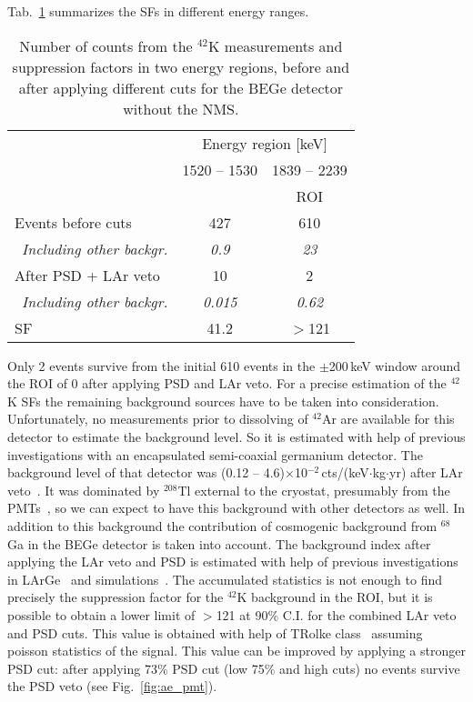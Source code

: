 \documentclass[twocolumn,epjc3]{svjour3}
\newcommand{\bbno} {{0\textnu\textbeta\textbeta\xspace}}
\newcommand{\ctsper} {{cts/(keV\(\cdot\)kg\(\cdot\)yr)}}
\newcommand{\LArGe} {{{LArGe}\xspace}}
\newcommand{\I}[2]{$^{#1}$#2}
\begin{document}
Tab.~\ref{tab:suppress_bare} summarizes the SFs in different energy ranges.
\begin{table}
  \begin{center}
  \caption{\label{tab:suppress_bare}Number of counts from the \I{42}{K} measurements and suppression factors in two energy regions, before and after applying different cuts for the BEGe detector without the NMS.}
\begin{tabular}{lcc}
\toprule
 &\multicolumn{2}{c}{Energy region [keV]} \\
 & 1520 -- 1530 & 1839 -- 2239  \\
 &  & ROI \\
\hline
Events before cuts & 427 & 610  \\
~\textit{Including other backgr.} & \textit{0.9} & \textit{23} \\
After PSD + LAr veto & 10 & 2 \\
~\textit{Including other backgr.} & \textit{0.015} & \textit{0.62} \\
SF & 41.2 &  \(>\)121 \\
\bottomrule
\end{tabular}
  \end{center}
\end{table}
Only 2 events survive from the initial 610 events in the $\pm$200\,keV window around the ROI of \bbno{} after applying PSD and LAr veto. For a precise estimation of the \I{42}{K} SFs the remaining background sources have to be taken into consideration. Unfortunately, no measurements prior to dissolving of \I{42}{Ar} are available for this detector to estimate the background level. So it is estimated with help of previous investigations with an encapsulated semi-coaxial germanium detector. The background level of that detector was (0.12 -- 4.6)$\times$10$^{-2}$\,\ctsper{} after LAr veto~\cite{LArGe}. It was dominated by \I{208}{Tl} external to the cryostat, presumably from the PMTs~\cite{LArGe}, so we can expect to have this background with other detectors as well. In addition to this background the contribution of cosmogenic background from \I{68}{Ga} in the BEGe detector is taken into account. The background index after applying the LAr veto and PSD is estimated with help of previous investigations in \LArGe{}~\cite{LArGe} and simulations~\cite{phd_bjoern}. The accumulated statistics is not enough to find precisely the suppression factor for the \I{42}{K} background in the ROI, but it is possible to obtain a lower limit of $>$121 at 90\% C.I. for the combined LAr veto and PSD cuts. This value is obtained with help of TRolke class~\cite{TRolke} assuming poisson statistics of the signal. This value can be improved by applying a stronger PSD cut: after applying 73\% PSD cut (low 75\% and high cuts) no events survive the PSD veto (see Fig.~\ref{fig:ae_pmt}).
\end{document}

